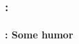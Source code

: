 \documentclass[xcolor=table]{beamer}
\begin{document}
%	
%	

\begin{frame}
	\frametitle{\insertshortsubtitle: \insertsection}
	\framesubtitle{\insertsubsection: Some humor}
	
	\begin{center}
	\end{center}
	
\end{frame}
\end{document}
